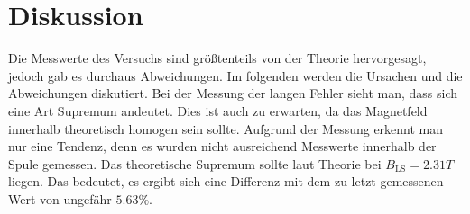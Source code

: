 \section{Diskussion}
\label{sec:Diskussion}

Die Messwerte des Versuchs sind größtenteils von der Theorie hervorgesagt, jedoch gab es durchaus Abweichungen.
Im folgenden werden die Ursachen und die Abweichungen diskutiert.
Bei der Messung der langen Fehler sieht man, dass sich eine Art Supremum andeutet.
Dies ist auch zu erwarten, da das Magnetfeld innerhalb theoretisch homogen sein sollte.
Aufgrund der Messung erkennt man nur eine Tendenz, denn es wurden nicht ausreichend Messwerte innerhalb der Spule gemessen.
Das theoretische Supremum sollte laut Theorie bei $B_{\text{LS}} = 2.31 T$ liegen.
Das bedeutet, es ergibt sich eine Differenz mit dem zu letzt gemessenen Wert von ungefähr $5.63\%$.
